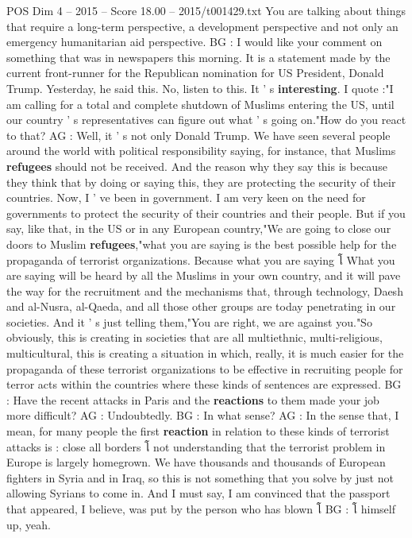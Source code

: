 \begin{textsample}{POS Dim 4 – 2015 – Score 18.00 – 2015/t001429.txt}
You are talking about things that require a long-term perspective, a development perspective and not only an emergency humanitarian aid perspective.
BG : I would like your comment on something that was in newspapers this morning.
It is a statement made by the current front-runner for the Republican nomination for US President, Donald Trump.
Yesterday, he said this.
No, listen to this.
It ' s \textbf{interesting}.
I quote :"I am calling for a total and complete shutdown of Muslims entering the US, until our country ' s representatives can figure out what ' s going on."How do you react to that?
AG : Well, it ' s not only Donald Trump.
We have seen several people around the world with political responsibility saying, for instance, that Muslims \textbf{refugees} should not be received.
And the reason why they say this is because they think that by doing or saying this, they are protecting the security of their countries.
Now, I ' ve been in government.
I am very keen on the need for governments to protect the security of their countries and their people.
But if you say, like that, in the US or in any European country,"We are going to close our doors to Muslim \textbf{refugees},"what you are saying is the best possible help for the propaganda of terrorist organizations.
Because what you are saying โ What you are saying will be heard by all the Muslims in your own country, and it will pave the way for the recruitment and the mechanisms that, through technology, Daesh and al-Nusra, al-Qaeda, and all those other groups are today penetrating in our societies.
And it ' s just telling them,"You are right, we are against you."So obviously, this is creating in societies that are all multiethnic, multi-religious, multicultural, this is creating a situation in which, really, it is much easier for the propaganda of these terrorist organizations to be effective in recruiting people for terror acts within the countries where these kinds of sentences are expressed.
BG : Have the recent attacks in Paris and the \textbf{reactions} to them made your job more difficult?
AG : Undoubtedly.
BG : In what sense?
AG : In the sense that, I mean, for many people the first \textbf{reaction} in relation to these kinds of terrorist attacks is : close all borders โ not understanding that the terrorist problem in Europe is largely homegrown.
We have thousands and thousands of European fighters in Syria and in Iraq, so this is not something that you solve by just not allowing Syrians to come in.
And I must say, I am convinced that the passport that appeared, I believe, was put by the person who has blown โ BG : โ himself up, yeah.

\end{textsample}
